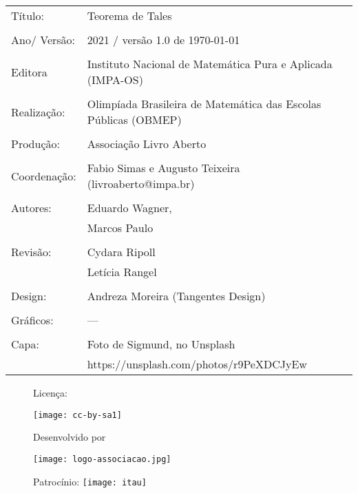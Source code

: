 \begin{tabular}{p{}p{}}
Título: & Teorema de Tales\\
\\
Ano/ Versão: & 2021 / versão 1.0 de \today\\
\\
Editora & Instituto Nacional de Matem\'atica Pura e Aplicada (IMPA-OS)\\
\\
Realização:& Olimp\'iada Brasileira de Matem\'atica das Escolas P\'ublicas (OBMEP)\\
\\
Produção:& Associação Livro Aberto\\
\\
Coordenação: & Fabio Simas e Augusto Teixeira (livroaberto@impa.br)\\
\\
  Autores: & Eduardo Wagner,\\
        & Marcos Paulo\\
\\
Revisão: &  Cydara Ripoll  \\
          &  Letícia Rangel \\
\\
Design: & Andreza Moreira (Tangentes Design) \\
\\
Gráficos: & --- \\
\\
  Capa: & Foto de Sigmund, no Unsplash \\
        & https://unsplash.com/photos/r9PeXDCJyEw \\

\end{tabular}

\begin{figure}[b]
\begin{minipage}[l]{5cm}
\centering

{\large Licença:}

  \texttt{[image: cc-by-sa1]}
\end{minipage}\hfill
\begin{minipage}[c]{5cm}
\centering
{\large Desenvolvido por}

\texttt{[image: logo-associacao.jpg]}
\end{minipage}
\begin{minipage}[r]{5cm}
\centering

{\large Patrocínio:}
  \vspace{1em}
  \texttt{[image: itau]}
\end{minipage}
\end{figure}

